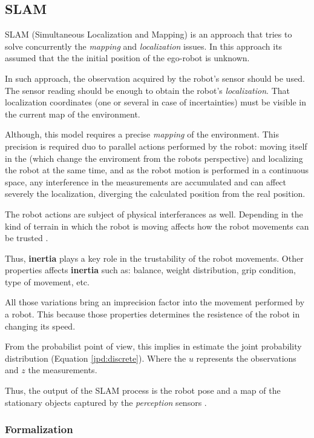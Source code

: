 \subsection{SLAM}

SLAM (Simultaneous Localization and Mapping) is an approach that tries to solve concurrently the \textit{mapping} and \textit{localization} issues\cite{VU-2009-454238}. In this approach its assumed that the the initial position of the ego-robot is unknown. 

In such approach,  the observation acquired by the robot's sensor should be used. The sensor reading should be enough to obtain the robot's \textit{localization}. That localization coordinates (one or several in case of incertainties) must be visible in the current map of the environment. 

Although, this model requires a precise \textit{mapping} of the environment. This precision is required duo to parallel actions performed by the robot: moving itself in the (which change the enviroment from the robots perspective) and localizing the robot at the same time, and as the robot motion is performed in a continuous space, any interference in the measurements are accumulated and can affect severely the localization, diverging the calculated position from the real position.

The robot actions are subject of physical interferances as well. Depending in the kind of terrain in which the robot is moving affects how the robot movements can be trusted \cite{DBLP:conf/icra/LenainTHM11}. 

Thus, \textbf{inertia} plays a key role in the trustability of the robot movements. Other properties affects \textbf{inertia} such as: balance, weight distribution, grip condition, type of movement, etc.

All those variations bring an imprecision factor into the movement performed by a robot. This because those properties determines the resistence of the robot in changing its speed.

From the probabilist point of view, this implies in estimate the joint probability distribution (Equation \ref{jpd:discrete}). Where the $u$ represents the observations and $z$ the measurements.

Thus, the output of the SLAM process is the robot pose and a map of the stationary objects captured by the \textit{perception} sensors \cite{iyengar1991autonomous}.

\subsubsection{Formalization}

